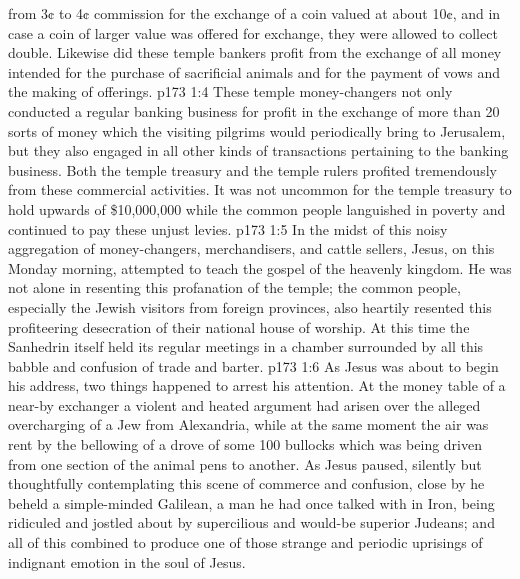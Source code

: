 from 3¢ to 4¢ commission for the exchange of a coin valued at about 10¢, and in case a coin of larger value was offered for exchange, they were allowed to collect double. Likewise did these temple bankers profit from the exchange of all money intended for the purchase of sacrificial animals and for the payment of vows and the making of offerings.
\vs p173 1:4 These temple money\hyp{}changers not only conducted a regular banking business for profit in the exchange of more than 20 sorts of money which the visiting pilgrims would periodically bring to Jerusalem, but they also engaged in all other kinds of transactions pertaining to the banking business. Both the temple treasury and the temple rulers profited tremendously from these commercial activities. It was not uncommon for the temple treasury to hold upwards of \$10,000,000 while the common people languished in poverty and continued to pay these unjust levies.
\vs p173 1:5 \pc In the midst of this noisy aggregation of money\hyp{}changers, merchandisers, and cattle sellers, Jesus, on this Monday morning, attempted to teach the gospel of the heavenly kingdom. He was not alone in resenting this profanation of the temple; the common people, especially the Jewish visitors from foreign provinces, also heartily resented this profiteering desecration of their national house of worship. At this time the Sanhedrin itself held its regular meetings in a chamber surrounded by all this babble and confusion of trade and barter.
\vs p173 1:6 As Jesus was about to begin his address, two things happened to arrest his attention. At the money table of a near\hyp{}by exchanger a violent and heated argument had arisen over the alleged overcharging of a Jew from Alexandria, while at the same moment the air was rent by the bellowing of a drove of some 100 bullocks which was being driven from one section of the animal pens to another. As Jesus paused, silently but thoughtfully contemplating this scene of commerce and confusion, close by he beheld a simple\hyp{}minded Galilean, a man he had once talked with in Iron, being ridiculed and jostled about by supercilious and would\hyp{}be superior Judeans; and all of this combined to produce one of those strange and periodic uprisings of indignant emotion in the soul of Jesus.

